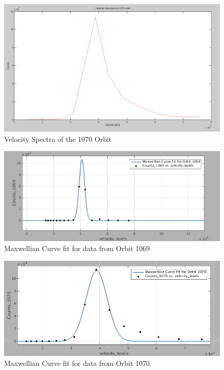 \documentclass{article}
\begin{document}
\begin{figure}[htb!]
\centering
\includegraphics[scale=0.35]{Figures/velocity_spectra_1070.png}
\caption{Velocity Spectra of the 1070 Orbit}
\label{fig:Velocity_spectra_1070}
\end{figure}

\begin{figure}[!htb]
\centering
\includegraphics[scale=0.45]{Figures/curvefit_1069.png}
\caption{Maxwellian Curve fit for data from Orbit 1069}
\label{fig:curvefit_1069}
\end{figure}

\begin{figure}
\centering
\includegraphics[scale= 0.45]{Figures/curvefit_1070.png}
\caption{Maxwellian Curve fit for data from Orbit 1070}
\label{fig:curvefit_1070}
\end{figure}
\end{document}
